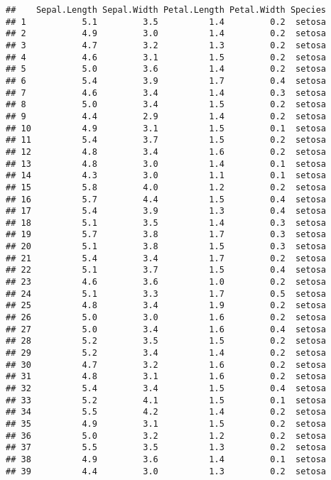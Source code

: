 \documentclass[
]{article}
\begin{document}
\begin{verbatim}
##    Sepal.Length Sepal.Width Petal.Length Petal.Width Species
## 1           5.1         3.5          1.4         0.2  setosa
## 2           4.9         3.0          1.4         0.2  setosa
## 3           4.7         3.2          1.3         0.2  setosa
## 4           4.6         3.1          1.5         0.2  setosa
## 5           5.0         3.6          1.4         0.2  setosa
## 6           5.4         3.9          1.7         0.4  setosa
## 7           4.6         3.4          1.4         0.3  setosa
## 8           5.0         3.4          1.5         0.2  setosa
## 9           4.4         2.9          1.4         0.2  setosa
## 10          4.9         3.1          1.5         0.1  setosa
## 11          5.4         3.7          1.5         0.2  setosa
## 12          4.8         3.4          1.6         0.2  setosa
## 13          4.8         3.0          1.4         0.1  setosa
## 14          4.3         3.0          1.1         0.1  setosa
## 15          5.8         4.0          1.2         0.2  setosa
## 16          5.7         4.4          1.5         0.4  setosa
## 17          5.4         3.9          1.3         0.4  setosa
## 18          5.1         3.5          1.4         0.3  setosa
## 19          5.7         3.8          1.7         0.3  setosa
## 20          5.1         3.8          1.5         0.3  setosa
## 21          5.4         3.4          1.7         0.2  setosa
## 22          5.1         3.7          1.5         0.4  setosa
## 23          4.6         3.6          1.0         0.2  setosa
## 24          5.1         3.3          1.7         0.5  setosa
## 25          4.8         3.4          1.9         0.2  setosa
## 26          5.0         3.0          1.6         0.2  setosa
## 27          5.0         3.4          1.6         0.4  setosa
## 28          5.2         3.5          1.5         0.2  setosa
## 29          5.2         3.4          1.4         0.2  setosa
## 30          4.7         3.2          1.6         0.2  setosa
## 31          4.8         3.1          1.6         0.2  setosa
## 32          5.4         3.4          1.5         0.4  setosa
## 33          5.2         4.1          1.5         0.1  setosa
## 34          5.5         4.2          1.4         0.2  setosa
## 35          4.9         3.1          1.5         0.2  setosa
## 36          5.0         3.2          1.2         0.2  setosa
## 37          5.5         3.5          1.3         0.2  setosa
## 38          4.9         3.6          1.4         0.1  setosa
## 39          4.4         3.0          1.3         0.2  setosa

\end{verbatim}
\end{document}
